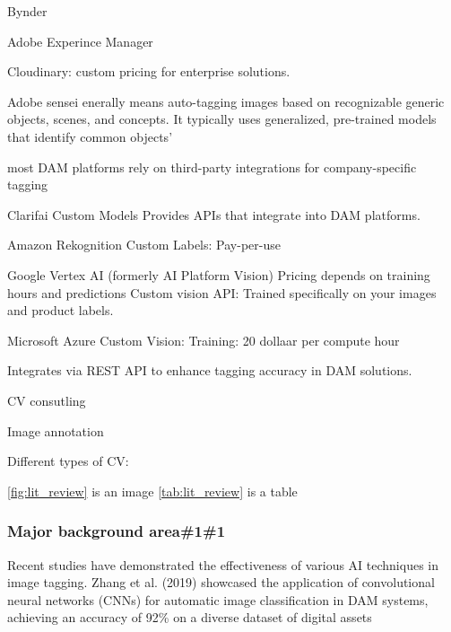 \documentclass[a4paper,10pt,twocolumn]{article}
\numberwithin{figure}{section}
\numberwithin{table}{section}
\begin{document}

Bynder


Adobe Experince Manager 

Cloudinary:  custom pricing for enterprise solutions.

Adobe sensei 
enerally means auto-tagging images based on recognizable 
generic objects, scenes, and concepts. It typically uses 
generalized, pre-trained models that identify common objects'

most DAM platforms rely on third-party integrations 
for company-specific tagging


Clarifai Custom Models
Provides APIs that integrate into DAM platforms.


Amazon Rekognition Custom Labels: Pay-per-use


Google Vertex AI (formerly AI Platform Vision)
Pricing depends on training hours and predictions
Custom vision API: Trained specifically on your images and product labels.

Microsoft Azure Custom Vision: Training: 20 dollaar per compute hour 

Integrates via REST API to enhance tagging accuracy in DAM solutions.

CV consutling 

Image annotation 

Different types of CV:

\ref{fig:lit_review} is an image 
\ref{tab:lit_review} is a table

\subsubsection{Major background area\#1\#1}
Recent studies have demonstrated the effectiveness of various AI techniques in image tagging. 
Zhang et al. (2019) showcased the application of convolutional neural networks (CNNs) for automatic 
image classification in DAM systems, achieving an accuracy of 92\% on a diverse dataset of digital assets
\end{document}
